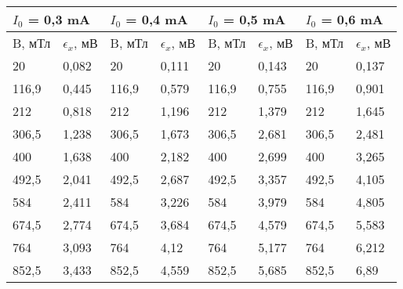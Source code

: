 \documentclass[a4paper, 12pt]{article}
\begin{document}
\begin{center}
\begin{tabular}{|ll|ll|ll|ll|}
\hline
\multicolumn{2}{|l|}{$I_0$ = 0,3 mA}            & \multicolumn{2}{l|}{$I_0$ = 0,4 mA}            & \multicolumn{2}{l|}{$I_0$ = 0,5 mA}            & \multicolumn{2}{l|}{$I_0$ = 0,6 mA}            \\ \hline
\multicolumn{1}{|l|}{B, мТл} & $\epsilon_x$, мВ & \multicolumn{1}{l|}{B, мТл} & $\epsilon_x$, мВ & \multicolumn{1}{l|}{B, мТл} & $\epsilon_x$, мВ & \multicolumn{1}{l|}{B, мТл} & $\epsilon_x$, мВ \\ \hline
\multicolumn{1}{|l|}{20}     & 0,082            & \multicolumn{1}{l|}{20}     & 0,111            & \multicolumn{1}{l|}{20}     & 0,143            & \multicolumn{1}{l|}{20}     & 0,137            \\ \hline
\multicolumn{1}{|l|}{116,9}  & 0,445            & \multicolumn{1}{l|}{116,9}  & 0,579            & \multicolumn{1}{l|}{116,9}  & 0,755            & \multicolumn{1}{l|}{116,9}  & 0,901            \\ \hline
\multicolumn{1}{|l|}{212}    & 0,818            & \multicolumn{1}{l|}{212}    & 1,196            & \multicolumn{1}{l|}{212}    & 1,379            & \multicolumn{1}{l|}{212}    & 1,645            \\ \hline
\multicolumn{1}{|l|}{306,5}  & 1,238            & \multicolumn{1}{l|}{306,5}  & 1,673            & \multicolumn{1}{l|}{306,5}  & 2,681            & \multicolumn{1}{l|}{306,5}  & 2,481            \\ \hline
\multicolumn{1}{|l|}{400}    & 1,638            & \multicolumn{1}{l|}{400}    & 2,182            & \multicolumn{1}{l|}{400}    & 2,699            & \multicolumn{1}{l|}{400}    & 3,265            \\ \hline
\multicolumn{1}{|l|}{492,5}  & 2,041            & \multicolumn{1}{l|}{492,5}  & 2,687            & \multicolumn{1}{l|}{492,5}  & 3,357            & \multicolumn{1}{l|}{492,5}  & 4,105            \\ \hline
\multicolumn{1}{|l|}{584}    & 2,411            & \multicolumn{1}{l|}{584}    & 3,226            & \multicolumn{1}{l|}{584}    & 3,979            & \multicolumn{1}{l|}{584}    & 4,805            \\ \hline
\multicolumn{1}{|l|}{674,5}  & 2,774            & \multicolumn{1}{l|}{674,5}  & 3,684            & \multicolumn{1}{l|}{674,5}  & 4,579            & \multicolumn{1}{l|}{674,5}  & 5,583            \\ \hline
\multicolumn{1}{|l|}{764}    & 3,093            & \multicolumn{1}{l|}{764}    & 4,12             & \multicolumn{1}{l|}{764}    & 5,177            & \multicolumn{1}{l|}{764}    & 6,212            \\ \hline
\multicolumn{1}{|l|}{852,5}  & 3,433            & \multicolumn{1}{l|}{852,5}  & 4,559            & \multicolumn{1}{l|}{852,5}  & 5,685            & \multicolumn{1}{l|}{852,5}  & 6,89             \\ \hline
\end{tabular}
\end{center}
\end{document}
